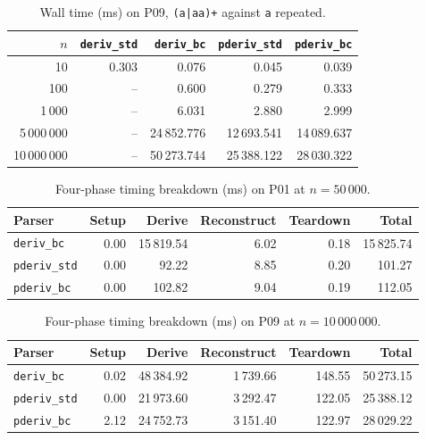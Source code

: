 \begin{table}[H]
\centering
\small
\setlength{\tabcolsep}{4pt}
\begin{tabular*}{\textwidth}{@{\extracolsep{\fill}} r rrrr}
\hline
$n$ & \texttt{deriv\_std} & \texttt{deriv\_bc} & \texttt{pderiv\_std} & \texttt{pderiv\_bc} \\
\hline
10             &        0.303 &      0.076 &      0.045 &      0.039 \\
100            &           -- &      0.600 &      0.279 &      0.333 \\
1\,000         &           -- &      6.031 &      2.880 &      2.999 \\
5\,000\,000    &           -- & 24\,852.776 & 12\,693.541 & 14\,089.637 \\
10\,000\,000   &           -- & 50\,273.744 & 25\,388.122 & 28\,030.322 \\
\hline
\end{tabular*}
\caption{Wall time (ms) on P09, \texttt{(a|aa)+} against \texttt{a}
repeated.}
\label{tab:patho-p09-all-parsers}
\end{table}

%
%
%

\begin{table}[H]
\centering
\small
\setlength{\tabcolsep}{4pt}
\begin{tabular*}{\textwidth}{@{\extracolsep{\fill}} l rrrrr}
\hline
Parser & Setup & Derive & Reconstruct & Teardown & Total \\
\hline
\texttt{deriv\_bc}        & 0.00 & 15\,819.54 & 6.02 & 0.18 & 15\,825.74 \\
\texttt{pderiv\_std}      & 0.00 &     92.22 & 8.85 & 0.20 &    101.27 \\
\texttt{pderiv\_bc}       & 0.00 &    102.82 & 9.04 & 0.19 &    112.05 \\
\hline
\end{tabular*}
\caption{Four-phase timing breakdown (ms) on P01 at $n=50\,000$.}
\label{tab:patho-phases-p01}
\end{table}

%

\begin{table}[H]
\centering
\small
\setlength{\tabcolsep}{4pt}
\begin{tabular*}{\textwidth}{@{\extracolsep{\fill}} l rrrrr}
\hline
Parser & Setup & Derive & Reconstruct & Teardown & Total \\
\hline
\texttt{deriv\_bc}        &  0.02 & 48\,384.92 & 1\,739.66 & 148.55 & 50\,273.15 \\
\texttt{pderiv\_std}      &  0.00 & 21\,973.60 & 3\,292.47 & 122.05 & 25\,388.12 \\
\texttt{pderiv\_bc}       &  2.12 & 24\,752.73 & 3\,151.40 & 122.97 & 28\,029.22 \\
\hline
\end{tabular*}
\caption{Four-phase timing breakdown (ms) on P09 at $n=10\,000\,000$.}
\label{tab:patho-phases-p09}
\end{table}


